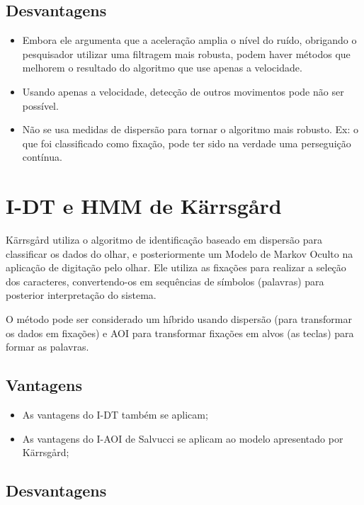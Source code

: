 \documentclass[brazil,]{report}
\begin{document}
\subsection{Desvantagens}\label{desvantagens-6}

\begin{itemize}
\itemsep1pt\parskip0pt
\item
  Embora ele argumenta que a aceleração amplia o nível do ruído,
  obrigando o pesquisador utilizar uma filtragem mais robusta, podem
  haver métodos que melhorem o resultado do algoritmo que use apenas a
  velocidade.
\item
  Usando apenas a velocidade, detecção de outros movimentos pode não ser
  possível.
\item
  Não se usa medidas de dispersão para tornar o algoritmo mais robusto.
  Ex: o que foi classificado como fixação, pode ter sido na verdade uma
  perseguição contínua.
\end{itemize}

\section{\gls{I-DT} e HMM de Kärrsgård}\label{e-hmm-de-kuxe4rrsguxe5rd}

Kärrsgård utiliza o algoritmo de identificação baseado em dispersão para
classificar os dados do olhar, e posteriormente um Modelo de Markov
Oculto na aplicação de digitação pelo olhar. Ele utiliza as fixações
para realizar a seleção dos caracteres, convertendo-os em sequências de
símbolos (palavras) para posterior interpretação do sistema.

O método pode ser considerado um híbrido usando dispersão (para
transformar os dados em fixações) e AOI para transformar fixações em
alvos (as teclas) para formar as palavras.

\subsection{Vantagens}\label{vantagens-7}

\begin{itemize}
\itemsep1pt\parskip0pt
\item
  As vantagens do I-DT também se aplicam;
\item
  As vantagens do I-AOI de Salvucci se aplicam ao modelo apresentado por
  Kärrsgård;
\end{itemize}

\subsection{Desvantagens}\label{desvantagens-7}
\end{document}
